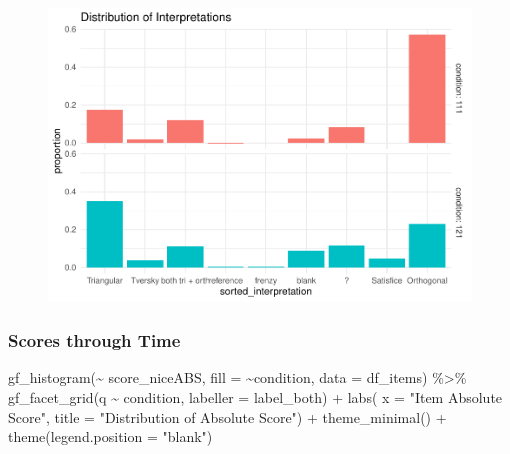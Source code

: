 \documentclass[
  letterpaper,
  DIV=11,
  numbers=noendperiod]{scrreprt}
\newenvironment{Shaded}{\begin{snugshade}}{\end{snugshade}}
\newcommand{\AttributeTok}[1]{\textcolor[rgb]{0.40,0.45,0.13}{#1}}
\newcommand{\FunctionTok}[1]{\textcolor[rgb]{0.28,0.35,0.67}{#1}}
\newcommand{\NormalTok}[1]{\textcolor[rgb]{0.00,0.23,0.31}{#1}}
\newcommand{\SpecialCharTok}[1]{\textcolor[rgb]{0.37,0.37,0.37}{#1}}
\newcommand{\StringTok}[1]{\textcolor[rgb]{0.13,0.47,0.30}{#1}}
\begin{document}
\begin{figure}[H]

{\centering \includegraphics{analysis/SGC3A/2_sgc3A_scoring_files/figure-pdf/unnamed-chunk-81-3.pdf}

}

\end{figure}

\hypertarget{scores-through-time}{%
\subsubsection{Scores through Time}\label{scores-through-time}}

\begin{Shaded}
\begin{Highlighting}[]
\FunctionTok{gf\_histogram}\NormalTok{(}\SpecialCharTok{\textasciitilde{}}\NormalTok{ score\_niceABS, }\AttributeTok{fill =} \SpecialCharTok{\textasciitilde{}}\NormalTok{condition, }\AttributeTok{data =}\NormalTok{ df\_items) }\SpecialCharTok{\%\textgreater{}\%} 
  \FunctionTok{gf\_facet\_grid}\NormalTok{(q }\SpecialCharTok{\textasciitilde{}}\NormalTok{ condition, }\AttributeTok{labeller =}\NormalTok{ label\_both) }\SpecialCharTok{+} 
  \FunctionTok{labs}\NormalTok{( }\AttributeTok{x =} \StringTok{"Item Absolute Score"}\NormalTok{, }\AttributeTok{title =} \StringTok{"Distribution of Absolute Score"}\NormalTok{) }\SpecialCharTok{+} \FunctionTok{theme\_minimal}\NormalTok{() }\SpecialCharTok{+} \FunctionTok{theme}\NormalTok{(}\AttributeTok{legend.position =} \StringTok{"blank"}\NormalTok{)}
\end{Highlighting}
\end{Shaded}
\end{document}
